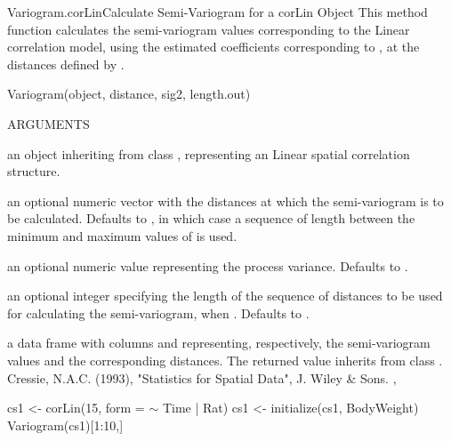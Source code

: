 \documentclass[pdftex]{article} \usepackage{url,graphicx}
\renewcommand{\Twiddle}{\mbox{\(\sim\)}}
\begin{document}
\begin{Helpfile}{Variogram.corLin}{Calculate Semi-Variogram for a corLin Object}
This method function calculates the semi-variogram values
corresponding to the Linear correlation model, using the estimated
coefficients corresponding to , at the distances defined
by .
\begin{Example}
Variogram(object, distance, sig2, length.out)
\end{Example}
\begin{Argument}{ARGUMENTS}
\item[\Co{object:}]
an object inheriting from class ,
representing an Linear spatial correlation structure.
\item[\Co{distance:}]
an optional numeric vector with the distances at
which the semi-variogram is to be calculated. Defaults to
, in which case a sequence of length 
between the minimum and maximum values of
 is used.
\item[\Co{sig2:}]
an optional numeric value representing the process
variance. Defaults to .
\item[\Co{length.out:}]
an optional integer specifying the length of the
sequence of distances to be used for calculating the semi-variogram,
when . Defaults to .
\end{Argument}
a data frame with columns  and  representing,
respectively, the semi-variogram values and the corresponding
distances. The returned value inherits from class .
Cressie, N.A.C. (1993), "Statistics for Spatial Data", J. Wiley \& Sons.
, 
\need 15pt
\vspace{-16pt}
\begin{Example}
cs1 <- corLin(15, form = {\Twiddle} Time | Rat)
cs1 <- initialize(cs1, BodyWeight)
Variogram(cs1)[1:10,]
\end{Example}
\end{Helpfile}
\end{document}
